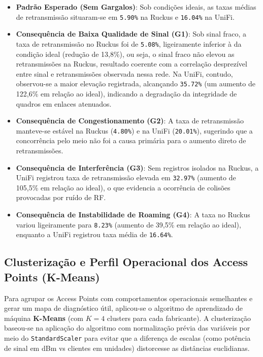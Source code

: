 \begin{itemize}
  \item \textbf{Padrão Esperado (Sem Gargalos)}: Sob condições ideais, as taxas médias de retransmissão situaram-se em \texttt{5.90\%} na Ruckus e \texttt{16.04\%} na UniFi.
  \item \textbf{Consequência de Baixa Qualidade de Sinal (G1)}: Sob sinal fraco, a taxa de retransmissão no Ruckus foi de \texttt{5.08\%}, ligeiramente inferior à da condição ideal (redução de 13,8\%), ou seja, o sinal fraco não elevou as retransmissões na Ruckus, resultado coerente com a correlação desprezível entre sinal e retransmissões observada nessa rede. Na UniFi, contudo, observou-se a maior elevação registrada, alcançando \texttt{35.72\%} (um aumento de 122,6\% em relação ao ideal), indicando a degradação da integridade de quadros em enlaces atenuados.
  \item \textbf{Consequência de Congestionamento (G2)}: A taxa de retransmissão manteve-se estável na Ruckus (\texttt{4.80\%}) e na UniFi (\texttt{20.01\%}), sugerindo que a concorrência pelo meio não foi a causa primária para o aumento direto de retransmissões.
  \item \textbf{Consequência de Interferência (G3)}: Sem registros isolados na Ruckus, a UniFi registrou taxa de retransmissão elevada em \texttt{32.97\%} (aumento de 105,5\% em relação ao ideal), o que evidencia a ocorrência de colisões provocadas por ruído de RF.
  \item \textbf{Consequência de Instabilidade de Roaming (G4)}: A taxa no Ruckus variou ligeiramente para \texttt{8.23\%} (aumento de 39,5\% em relação ao ideal), enquanto a UniFi registrou taxa média de \texttt{16.64\%}.


\end{itemize}
\subsection{Clusterização e Perfil Operacional dos Access Points (K-Means)}
\label{subsec:resultados_kmeans}

Para agrupar os Access Points com comportamentos operacionais semelhantes e gerar um mapa de diagnóstico útil, aplicou-se o algoritmo de aprendizado de máquina \textbf{K-Means} (com $K=4$ clusters para cada fabricante). A clusterização baseou-se na aplicação do algoritmo com normalização prévia das variáveis por meio do \texttt{StandardScaler} para evitar que a diferença de escalas (como potência de sinal em dBm vs clientes em unidades) distorcesse as distâncias euclidianas. 

